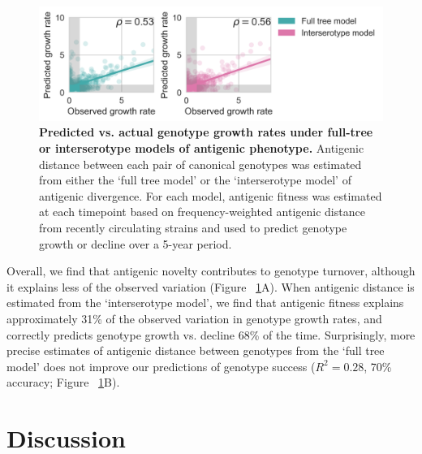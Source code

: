 \documentclass[11pt,oneside,letterpaper]{article}
\begin{document}
\begin{figure}[h]
\centering
\includegraphics[width=0.7\linewidth]{../figures/png/genotype_growth_rates.png}
\begin{centering}
    \caption{\textbf{Predicted vs. actual genotype growth rates under full-tree or interserotype models of antigenic phenotype.}  Antigenic distance between each pair of canonical genotypes was estimated from either the `full tree model' or the `interserotype model' of antigenic divergence. For each model, antigenic fitness was estimated at each timepoint based on frequency-weighted antigenic distance from recently circulating strains and used to predict genotype growth or decline over a 5-year period.}
     \label{genotype_growth_rates}
\end{centering}
\end{figure}

Overall, we find that antigenic novelty contributes to genotype turnover, although it explains less of the observed variation (Figure ~\ref{genotype_growth_rates}A).
When antigenic distance is estimated from the `interserotype model', we find that antigenic fitness explains approximately 31\% of the observed variation in genotype growth rates, and correctly predicts genotype growth vs. decline 68\% of the time.
Surprisingly, more precise estimates of antigenic distance between genotypes from the `full tree model' does not improve our predictions of genotype success ($R^2 = 0.28$, 70\% accuracy; Figure ~\ref{genotype_growth_rates}B).

\section*{Discussion}
\end{document}
